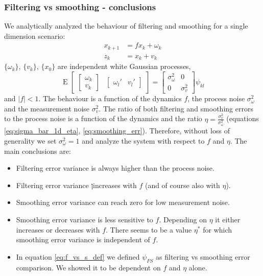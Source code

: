 \documentclass[oneside,12pt]{article}
\newcommand{\abs}[1]{\left| #1\right| }                   %
\begin{document}
\subsubsection{Filtering vs smoothing - conclusions}
We analytically analyzed the behaviour of filtering and smoothing for a single dimension scenario:
%
\begin{equation}\label{eq:kalmanModel_1d}
    \begin{split}
        x_{k+1} &= fx_k + \omega_k\\
        z_k &= x_k + v_k
    \end{split}
\end{equation}
%
$\{\omega_k\}$, $\{v_k\}$, $\{x_0\}$ are independent white Gaussian processes,
%
\begin{equation*}
    \operatorname{E} \begin{bmatrix} \begin{bmatrix} \omega_k \\ v_k \end{bmatrix} &  \begin{bmatrix} \omega_l' & v_l' \end{bmatrix} \end{bmatrix} = \begin{bmatrix} \sigma_\omega^2 & 0 \\ 0 & \sigma_v^2\end{bmatrix} \psi_{kl}
\end{equation*}
%
and $\abs{f}<1$. The behaviour is a function of the dynamics $f$, the process noise $\sigma_\omega^2$ and the measurement noise $\sigma_v^2$. The ratio of both filtering and smoothing errors to the process noise is a function of the dynamics and the ratio $\eta = \frac{\sigma_v^2}{\sigma_\omega^2}$ (equations \ref{eq:sigma_bar_1d_eta}, \ref{eq:smoothing_err}). Therefore, without loss of generality we set $\sigma_\omega^2=1$ and analyze the system with respect to $f$ and $\eta$. The main conclusions are:
%
\begin{itemize}
    \item Filtering error variance is always higher than the process noise.
    \item Filtering error variance ןincreases with $f$ (and of course also with $\eta$).
    \item Smoothing error variance can reach zero for low measurement noise.
    \item Smoothing error variance is less sensitive to $f$. Depending on $\eta$ it either increases or decreases with $f$. There seems to be a value $\eta^*$ for which smoothing error variance is independent of $f$.
    \item In equation \ref{eq:f_vs_s_def} we defined $\psi_{FS}$ as filtering vs smoothing error comparison. We showed it to be dependent on $f$ and $\eta$ alone.  
\end{itemize}
\end{document}
